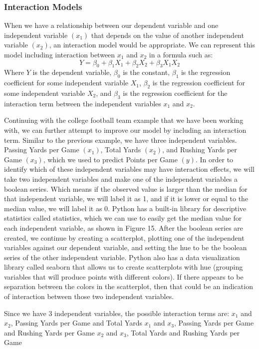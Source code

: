 \documentclass[a4paper,12pt]{report}
\begin{document}
\subsubsection{Interaction Models}
When we have a relationship between our dependent variable  and one independent variable $(x_1)$ that depends on the value of another independent variable $(x_2)$, an interaction model would be appropriate. We can represent this model including interaction between $x_1$ and $x_2$ in a formula such as:
$$Y=\beta_0+\beta_1X_1+\beta_2X_2+\beta_3X_1X_2$$
Where $Y$ is the dependent variable, $\beta_0$ is the constant, $\beta_1$ is the regression coefficient for some independent variable $X_1$, $\beta_2$ is the regression coefficient for some independent variable $X_2$, and $\beta_3$ is the regression coefficient for the interaction term between the independent variables $x_1$ and $x_2$.

Continuing with the college football team example that we have been working with, we can further attempt to improve our model by including an interaction term. Similar to the previous example, we have three independent variables. Passing Yards per Game $(x_1)$, Total Yards $(x_2)$, and Rushing Yards per Game $(x_3)$, which we used to predict Points per Game $(y)$. In order to identify which of these independent variables may have interaction effects, we will take two independent variables and make one of the independent variables a boolean series. Which means if the observed value is larger than the median for that independent variable, we will label it as 1, and if it is lower or equal to the median value, we will label it as 0. Python has a built-in library for descriptive statistics called statistics, which we can use to easily get the median value for each independent variable, as shown in Figure 15. After the boolean series are created, we continue by creating a scatterplot, plotting one of the independent variables against our dependent variable, and setting the hue to be the boolean series of the other independent variable. Python also has a data visualization library called seaborn that allows us to create scatterplots with hue (grouping variables that will produce points with different colors). If there appears to be separation between the colors in the scatterplot, then that could be an indication of interaction between those two independent variables. 

Since we have 3 independent variables, the possible interaction terms are:
$x_1$ and $x_2$, Passing Yards per Game and Total Yards
$x_1$ and $x_3$, Passing Yards per Game and Rushing Yards per Game
$x_2$ and $x_3$, Total Yards and Rushing Yards per Game
\end{document}
